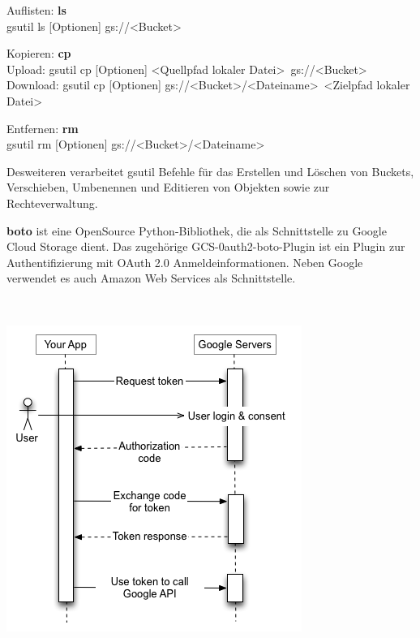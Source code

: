 \documentclass[13pt,a4paper,bibliography=totocnumbered,listof=totocnumbered]{scrartcl}
\begin{document}
\begin{compactitem}
	\item Auflisten: \textbf{ls}\\
	gsutil ls [Optionen] gs://\textless Bucket\textgreater
	\item Kopieren: \textbf{cp}\\
	Upload: gsutil cp [Optionen] \textless Quellpfad lokaler Datei\textgreater~gs://\textless Bucket\textgreater\\
	Download:  gsutil cp [Optionen] gs://\textless Bucket\textgreater/\textless Dateiname\textgreater~\textless Zielpfad lokaler Datei\textgreater
	\item Entfernen: \textbf{rm}\\
	gsutil rm [Optionen] gs://\textless Bucket\textgreater /\textless Dateiname\textgreater
\end{compactitem}

Desweiteren verarbeitet gsutil Befehle für das Erstellen und Löschen von Buckets, Verschieben, Umbenennen und Editieren von Objekten sowie zur Rechteverwaltung.

\textbf{boto} \cite{47} ist eine OpenSource Python-Bibliothek, die als Schnittstelle zu Google Cloud Storage dient. Das zugehörige GCS-0auth2-boto-Plugin ist ein Plugin zur Authentifizierung mit OAuth 2.0 Anmeldeinformationen. Neben Google verwendet es auch Amazon Web Services als Schnittstelle.

\vspace{1em}
$\;$\\
\begin{minipage}{\linewidth}
	\centering
	\includegraphics[width=0.7\linewidth]{./img/OAuth.png}
	\label{OAuthV}
\end{minipage}
\vspace{1em}
\end{document}
